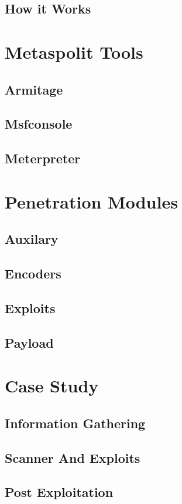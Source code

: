 \documentclass[11pt, a4paper]{report}
\begin{document}
\section{How it Works}

\chapter{Metaspolit Tools}
\section{Armitage}
\section{Msfconsole}
\section{Meterpreter}

\chapter{Penetration Modules}
\section{Auxilary}
\section{Encoders}
\section{Exploits}
\section{Payload}

\chapter{Case Study}
\section{Information Gathering}
\section{Scanner And Exploits}
\section{Post Exploitation}
\end{document}
